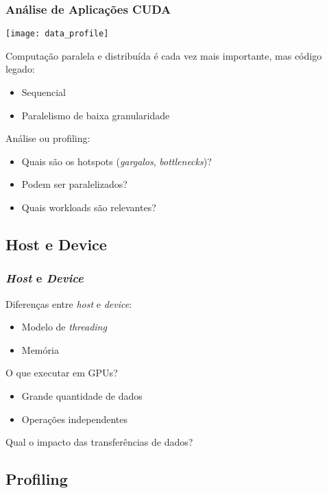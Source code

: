 \documentclass[10pt, compress]{beamer}
\begin{document}
\begin{frame}
    \frametitle{Análise de Aplicações CUDA}
    \begin{center}
        \texttt{[image: data\_profile]}
    \end{center}

    Computação \alert{paralela} e \alert{distribuída} é cada vez mais
    importante, mas \alert{código legado}:
    \begin{itemize}
        \item \alert{Sequencial}
        \item Paralelismo de \alert{baixa granularidade}
    \end{itemize}

    Análise ou \alert{profiling}:
    \begin{itemize}
        \item Quais são os \alert{hotspots} (\textit{gargalos}, \textit{bottlenecks})?
        \item Podem ser paralelizados?
        \item Quais \alert{workloads} são relevantes?
    \end{itemize}
\end{frame}

\subsection{Host e Device}

\begin{frame}
    \frametitle{\textit{Host} e \textit{Device}}
    Diferenças entre \textit{host} e \textit{device}:
    \begin{itemize}
        \item Modelo de \textit{threading}
        \item Memória
    \end{itemize}

    O que executar em \alert{GPUs}?
    \begin{itemize}
        \item Grande quantidade de \alert{dados}
        \item Operações \alert{independentes}
    \end{itemize}

    Qual o impacto das \alert{transferências de dados}?
\end{frame}

\subsection{Profiling}
\end{document}
